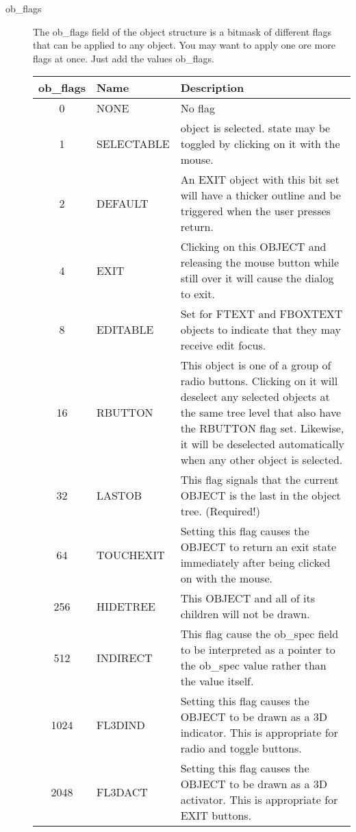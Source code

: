 \begin{description}
\item[ob\_flags] The ob\_flags field of the object structure is a bitmask of
different flags that can be applied to any object. You may want to apply 
one ore more flags at once. Just add the values ob\_flags.

\begin{center}\begin{longtable}{|clp{10cm}|}
\hline
{\bf ob\_flags} & {\bf Name} & {\bf Description}\\
\hline
0 & NONE       & No flag \\\hline
1 & SELECTABLE & object is selected. state may be toggled by clicking on it with the mouse.\\\hline
2 & DEFAULT    & An EXIT object with this bit set will have a thicker outline and be triggered when the 
                 user presses return.\\\hline
4 & EXIT       & Clicking on this OBJECT and releasing the mouse button while still over it 
                 will cause the dialog to exit.\\\hline
8 & EDITABLE   & Set for FTEXT and FBOXTEXT objects to indicate that they may receive edit focus.\\\hline
16 & RBUTTON   & This object is one of a group of radio buttons. Clicking on it will deselect
                 any selected objects at the same tree level that also have the RBUTTON flag
                 set. Likewise, it will be deselected automatically when any other object is selected.\\\hline
32 & LASTOB    & This flag signals that the current OBJECT is the last in the object tree. (Required!)\\\hline
64 & TOUCHEXIT & Setting this flag causes the OBJECT to return an exit state immediately after   
                 being clicked on with the mouse.\\\hline
256 & HIDETREE & This OBJECT and all of its children will not be drawn.\\\hline
512 & INDIRECT & This flag cause the ob\_spec field to be interpreted as a pointer to the      
                 ob\_spec value rather than the value itself.\\\hline
1024 & FL3DIND & Setting this flag causes the OBJECT to be drawn as a 3D indicator. This is  
                 appropriate for radio and toggle buttons.\\\hline
2048 & FL3DACT & Setting this flag causes the OBJECT to be drawn as a 3D activator. This is  
                 appropriate for EXIT buttons.\\\hline

\end{longtable}
\end{center}
\end{description}
